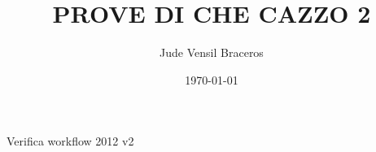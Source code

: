 \documentclass{article}
\title{PROVE DI CHE CAZZO 2}
\author{Jude Vensil Braceros}
\date{\today}
\begin{document}
\maketitle

Verifica workflow 2012 v2
\end{document}
